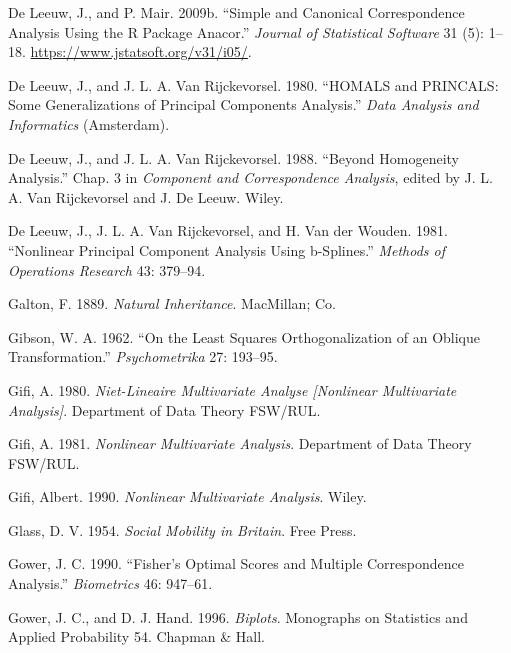 \documentclass[
  12pt,
  letterpaper,
  DIV=11,
  numbers=noendperiod]{scrreprt}
\newlength{\cslhangindent}
\newenvironment{CSLReferences}[2] %
 {\begin{list}{}{%
  \setlength{\itemindent}{0pt}
  \setlength{\leftmargin}{0pt}
  \setlength{\parsep}{0pt}
  \ifodd #1
   \setlength{\leftmargin}{\cslhangindent}
   \setlength{\itemindent}{-1\cslhangindent}
  \fi
  \setlength{\itemsep}{#2\baselineskip}}}
 {\end{list}}
\begin{document}
\begin{CSLReferences}{1}{1}
De Leeuw, J., and P. Mair. 2009b. {``Simple and Canonical Correspondence
Analysis Using the {R} Package Anacor.''} \emph{Journal of Statistical
Software} 31 (5): 1--18. \url{https://www.jstatsoft.org/v31/i05/}.

De Leeuw, J., and J. L. A. Van Rijckevorsel. 1980. {``{HOMALS} and
{PRINCALS}: Some Generalizations of Principal Components Analysis.''}
\emph{Data Analysis and Informatics} (Amsterdam).

De Leeuw, J., and J. L. A. Van Rijckevorsel. 1988. {``Beyond Homogeneity
Analysis.''} Chap. 3 in \emph{Component and Correspondence Analysis},
edited by J. L. A. Van Rijckevorsel and J. De Leeuw. Wiley.

De Leeuw, J., J. L. A. Van Rijckevorsel, and H. Van der Wouden. 1981.
{``Nonlinear Principal Component Analysis Using b-Splines.''}
\emph{Methods of Operations Research} 43: 379--94.

Galton, F. 1889. \emph{{Natural Inheritance}}. MacMillan; Co.

Gibson, W. A. 1962. {``{On the Least Squares Orthogonalization of an
Oblique Transformation}.''} \emph{Psychometrika} 27: 193--95.

Gifi, A. 1980. \emph{Niet-Lineaire Multivariate Analyse {[}Nonlinear
Multivariate Analysis{]}}. Department of Data Theory FSW/RUL.

Gifi, A. 1981. \emph{Nonlinear Multivariate Analysis}. Department of
Data Theory FSW/RUL.

Gifi, Albert. 1990. \emph{Nonlinear Multivariate Analysis}. Wiley.

Glass, D. V. 1954. \emph{{Social Mobility in Britain}}. Free Press.

Gower, J. C. 1990. {``{Fisher's Optimal Scores and Multiple
Correspondence Analysis}.''} \emph{Biometrics} 46: 947--61.

Gower, J. C., and D. J. Hand. 1996. \emph{{Biplots}}. Monographs on
Statistics and Applied Probability 54. {Chapman \& Hall}.


\end{CSLReferences}
\end{document}
